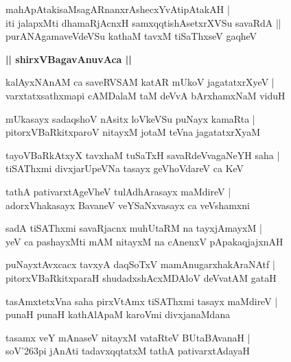 \documentclass[twoside,12pt,openright]{book}
\def\S{\char'263}
\newcounter{shloka}[chapter]
\def\uvaca#1{\centerline{{\large\textbf{#1}}}}
\begin{document}
\begin{shloka}%
mahApAtakisaMsagARnanxrAshecxYvAtipAtakAH |\\
iti jalapxMti dhamaRjAcnxH samxqqtishAsetxrXVSu savaRdA ||\\
purANAgamaveVdeVSu kathaM tavxM tiSaThxseV gaqheV
\end{shloka}
\uvaca{|| shirxVBagavAnuvAca ||}

\begin{shloka}%
kalAyxNAnAM ca saveRVSAM katAR mUkoV jagatatxrXyeV |\\
varxtatxsathxmapi cAMDalaM taM deVvA bArxhamxNaM viduH
\end{shloka}

\begin{shloka}%
mUkasayx sadaqshoV nAsitx loVkeVSu puNayx kamaRta |\\
pitorxVBaRkitxparoV nitayxM jotaM teVna jagatatxrXyaM 
\end{shloka}

\begin{shloka}%
tayoVBaRkAtxyX tavxhaM tuSaTxH savaRdeVvagaNeYH saha |\\
tiSAThxmi divxjarUpeVNa tasayx geVhoVdareV ca KeV 
\end{shloka}

\begin{shloka}%
tathA pativarxtAgeVheV tulAdhArasayx maMdireV |\\
adorxVhakasayx BavaneV veYSaNxvasayx ca veVshamxni
\end{shloka}

\begin{shloka}%
sadA tiSAThxmi savaRjacnx muhUtaRM na tayxjAmayxM |\\
yeV ca pashayxMti mAM nitayxM na cAnenxV pApakaqjajxnAH
\end{shloka}

\begin{shloka}%
puNayxtAvxcacx tavxyA daqSoTxV mamAnugarxhakAraNAtf |\\
pitorxVBaRkitxparaH shudadxshAcxMDAloV deVvatAM gataH 
\end{shloka}

\begin{shloka}%
tasAmxtetxVna saha pirxVtAmx tiSAThxmi tasayx maMdireV |\\
punaH punaH kathAlApaM karoVmi divxjanaMdana
\end{shloka}

\begin{shloka}%
tasamx veY mAnaseV nitayxM vataRteV BUtaBAvanaH |\\
soV\S pi jAnAti tadavxqqtatxM tathA pativarxtAdayaH 
\end{shloka}
\end{document}
